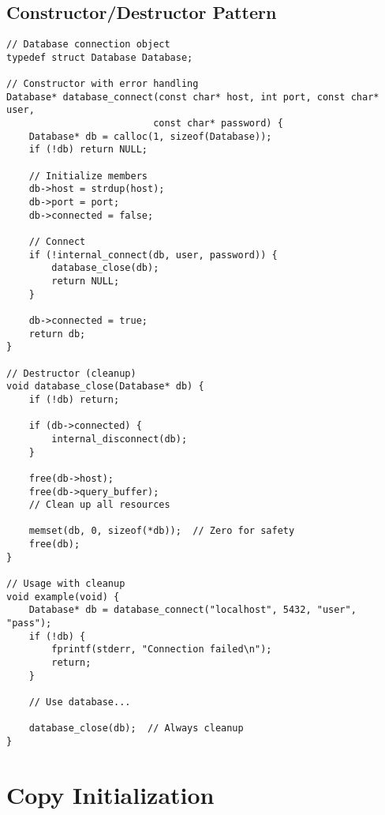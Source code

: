 \subsection{Constructor/Destructor Pattern}

\begin{lstlisting}
// Database connection object
typedef struct Database Database;

// Constructor with error handling
Database* database_connect(const char* host, int port, const char* user,
                          const char* password) {
    Database* db = calloc(1, sizeof(Database));
    if (!db) return NULL;

    // Initialize members
    db->host = strdup(host);
    db->port = port;
    db->connected = false;

    // Connect
    if (!internal_connect(db, user, password)) {
        database_close(db);
        return NULL;
    }

    db->connected = true;
    return db;
}

// Destructor (cleanup)
void database_close(Database* db) {
    if (!db) return;

    if (db->connected) {
        internal_disconnect(db);
    }

    free(db->host);
    free(db->query_buffer);
    // Clean up all resources

    memset(db, 0, sizeof(*db));  // Zero for safety
    free(db);
}

// Usage with cleanup
void example(void) {
    Database* db = database_connect("localhost", 5432, "user", "pass");
    if (!db) {
        fprintf(stderr, "Connection failed\n");
        return;
    }

    // Use database...

    database_close(db);  // Always cleanup
}
\end{lstlisting}

\section{Copy Initialization}

